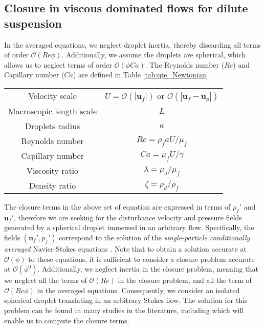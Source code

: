\subsection{Closure in viscous dominated flows for dilute suspension}
In the averaged equations, we neglect droplet inertia, thereby discarding all terms of order $\mathcal{O}(Re \phi)$. 
Additionally, we assume the droplets are spherical, which allows us to neglect terms of order $\mathcal{O}(\phi Ca)$. 
The Reynolds number ($Re$) and Capillary number ($Ca$) are defined in Table \ref{tab:qte_Newtonian}.
\begin{table}
\begin{tabular}{|c|c|}\hline\hline
    Velocity scale & $U = \mathcal{O}(|\textbf{u}_f|)$ or $\mathcal{O}(|\textbf{u}_f - \textbf{u}_p|)$ \\
    Macroscopic length scale & $L$ \\
    Droplets radius & $a$ \\
    Reynolds number & $Re = \rho_f a U / \mu_f$   \\
Capillary number & $Ca = \mu_f U / \gamma$ \\\hline
Viscosity ratio & $\lambda = \mu_d / \mu_f$ \\
Density ratio & $\zeta = \rho_d / \rho_f$ \\
    \end{tabular}
\end{table}

The closure terms in the above set of equation are expressed in terms of $p_f'$ and $\textbf{u}_f'$, therefore we are seeking for the disturbance velocity and pressure fields generated by a spherical droplet immersed in an arbitrary flow. 
Specifically, the fields $(\textbf{u}_f',p_f')$ correspond to the solution of the 
 \textit{single-particle conditionally averaged} Navier-Stokes equations \citep{hinch1977averaged,zhang1994averaged} . 
Note that to obtain a solution accurate at $\mathcal{O}(\phi)$ to these equations, it is sufficient to consider a closure problem accurate at $\mathcal{O}(\phi^0)$\citep{hinch1977averaged,zhang1994averaged}.
Additionally, we neglect inertia in the closure problem, meaning that we neglect all the terms of $\mathcal{O}(Re)$ in the closure problem, and all the term of $\mathcal{O}(Re\phi)$ in the averaged equations. 
Consequently, we consider an isolated spherical droplet translating in an arbitrary Stokes flow.
The solution for this problem can be found in many studies in the literature, including \citet{leal2007advanced,pozrikidis1992boundary,kim2013microhydrodynamics,pozrikidis2011introduction,nadim1991motion} which will enable us to compute the closure terms.

